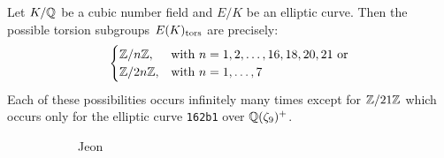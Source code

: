\begin{frame}[plain,c]
\footnotesize
\begin{thm}
Let $K/\mathbb{Q}$ be a cubic number field and $E/K$ be an elliptic curve. Then the possible torsion subgroups $E(K)_{\text{tors}}$ are precisely:
	\[
	\begin{cases}
	\mathbb{Z}/n\mathbb{Z}, & \text{with } n=1,2,\ldots,16,18,20,21 \text{ or} \\
	\mathbb{Z}/2n\mathbb{Z}, & \text{with }n=1,\ldots,7
	\end{cases}
	\] 
Each of these possibilities occurs infinitely many times except for $\mathbb{Z}/21\mathbb{Z}$ which occurs only for the elliptic curve \texttt{162b1} over $\mathbb{Q}(\zeta_9)^+$.
\end{thm}
	\begin{figure}[h]
	\centering
	\begin{subfigure}{0.10\textwidth}
	\captionsetup{labelformat=empty}
	\centering
	\caption{\hspace{0.2cm}\scriptsize{Jeon}}
	\end{subfigure} \quad\quad
	\begin{subfigure}{0.10\textwidth}

\end{subfigure}
\end{figure}
\end{frame}
